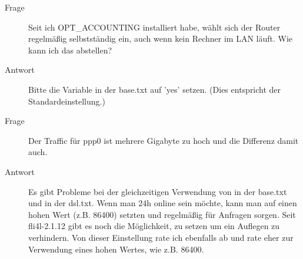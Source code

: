 \begin{description}
\item[Frage] Seit ich OPT\_ACCOUNTING installiert habe, wählt sich der Router
regelmäßig  selbstständig ein, auch wenn kein Rechner im LAN läuft.
Wie kann ich das abstellen?
\item[Antwort] Bitte die Variable  in der base.txt auf 'yes' setzen.
(Dies entspricht der Standardeinstellung.)
\end{description}

\begin{description}
\item[Frage] Der Traffic für ppp0 ist mehrere Gigabyte zu hoch und die Differenz
damit auch.
\item[Antwort] Es gibt Probleme bei der gleichzeitigen Verwendung von  in der
base.txt und  in der dsl.txt.
Wenn man 24h online sein möchte, kann man  auf einen
hohen Wert (z.B. 86400) setzten und regelmäßig für Anfragen sorgen.
Seit fli4l-2.1.12 gibt es noch die Möglichkeit,  zu
setzen um ein Auflegen zu verhindern. Von dieser Einstellung rate ich ebenfalls ab
und rate eher zur Verwendung eines hohen Wertes, wie z.B. 86400.
\end{description}
